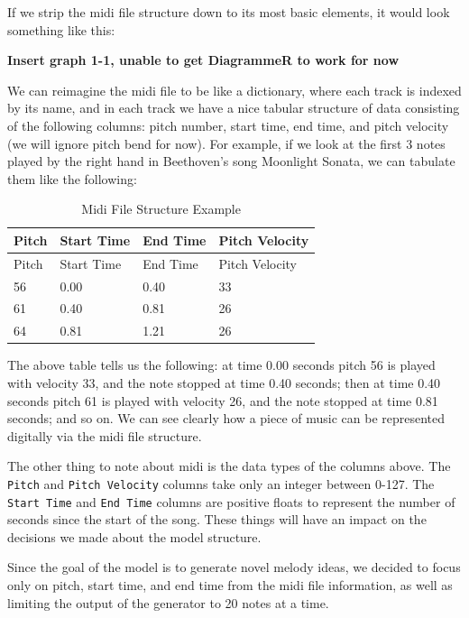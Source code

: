 \documentclass[12pt,oneside]{chicagocapstone}
\begin{document}
If we strip the midi file structure down to its most basic elements, it would look something like this:

\textbf{Insert graph 1-1, unable to get DiagrammeR to work for now}

We can reimagine the midi file to be like a dictionary, where each track is indexed by its name, and in each track we have a nice tabular structure of data consisting of the following columns: pitch number, start time, end time, and pitch velocity (we will ignore pitch bend for now). For example, if we look at the first 3 notes played by the right hand in Beethoven's song Moonlight Sonata, we can tabulate them like the following:
\begin{longtable}[]{@{}llll@{}}
\caption{Midi File Structure Example}\tabularnewline
\toprule
Pitch & Start Time & End Time & Pitch Velocity\tabularnewline
\midrule
\endfirsthead
\toprule
Pitch & Start Time & End Time & Pitch Velocity\tabularnewline
\midrule
\endhead
56 & 0.00 & 0.40 & 33\tabularnewline
61 & 0.40 & 0.81 & 26\tabularnewline
64 & 0.81 & 1.21 & 26\tabularnewline
\bottomrule
\end{longtable}
The above table tells us the following: at time 0.00 seconds pitch 56 is played with velocity 33, and the note stopped at time 0.40 seconds; then at time 0.40 seconds pitch 61 is played with velocity 26, and the note stopped at time 0.81 seconds; and so on. We can see clearly how a piece of music can be represented digitally via the midi file structure.

The other thing to note about midi is the data types of the columns above. The \texttt{Pitch} and \texttt{Pitch\ Velocity} columns take only an integer between 0-127. The \texttt{Start\ Time} and \texttt{End\ Time} columns are positive floats to represent the number of seconds since the start of the song. These things will have an impact on the decisions we made about the model structure.

Since the goal of the model is to generate novel melody ideas, we decided to focus only on pitch, start time, and end time from the midi file information, as well as limiting the output of the generator to 20 notes at a time.
\end{document}
